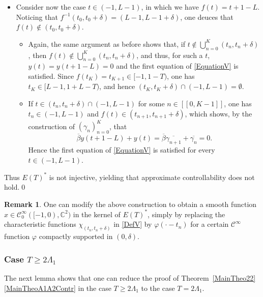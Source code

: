 \documentclass[JEP,XML,SOM,Unicode]{cedram}
\newcommand{\llbracket}{[\![}
\newcommand{\rrbracket}{]\!]}
\theoremstyle{plain}
\theoremstyle{definition}
\newtheorem{remk}[theo]{Remark}
\begin{document}
\begin{itemize}
\item
Consider now the case $t \in (-1, L - 1)$, in which we have $f(t) = t + 1 - L$.
Noticing that $f^{-1}(t_0, t_0 + \delta) = (L-1, L-1+\delta)$, one deuces that \hbox{$f(t) \notin (t_0, t_0 + \delta)$}.
\begin{itemize}
\item
Again, the same argument as before shows that, if $t \notin \bigcup_{n=0}^K (t_n, t_n + \delta)$, then \hbox{$f(t) \notin \bigcup_{n=0}^K (t_n, t_n + \delta)$}, and thus, for such a $t$, $y(t) = y(t + 1 - L) = 0$ and the first equation of \eqref{EquationV} is satisfied. Since $f(t_K) = t_{K + 1} \in [-1, 1 - T)$, one has $t_K \in [L - 1, 1 + L - T)$, and hence $(t_K, t_K + \delta) \cap (-1, L-1) = \emptyset$.
\item
If $t \in (t_n, t_n + \delta) \cap (-1, L-1)$ for some $n \in \llbracket 0, K-1\rrbracket$, one has $t_n \in (-1, L-1)$ and $f(t) \in (t_{n+1}, t_{n+1} + \delta)$, which shows, by the construction of $(\gamma_n)_{n=0}^K$, that
\[
\overline\beta y(t + 1 - L) + y(t) = \overline\beta \overline{\gamma_{n+1}} + \overline{\gamma_{n}} = 0.
\]
Hence the first equation of \eqref{EquationV} is satisfied for every $t \in (-1, L - 1)$.
\end{itemize}
\end{itemize}

Thus $E(T)^\ast$ is not injective, yielding that approximate controllability does not hold.\qed

\begin{remk}
One can modify the above construction to obtain a smooth function $x \in \mathcal C^\infty_0([-1, 0), \mathbb C^2)$ in the kernel of $E(T)^\ast$, simply by replacing the characteristic functions $\chi_{(t_n, t_n + \delta)}$ in \eqref{DefV} by $\varphi(\cdot - t_n)$ for a certain $\mathcal C^\infty$ function $\varphi$ compactly supported in $(0, \delta)$.
\end{remk}

\subsubsection{\texorpdfstring{Case $T \geq 2 \Lambda_1$}{Case T >= 2 Lambda1}}

The next lemma shows that one can reduce the proof of Theorem~\ref{MainTheo22}\eqref{MainTheoA1A2Contr} in the case $T \geq 2 \Lambda_1$ to the case $T = 2 \Lambda_1$.
\end{document}
